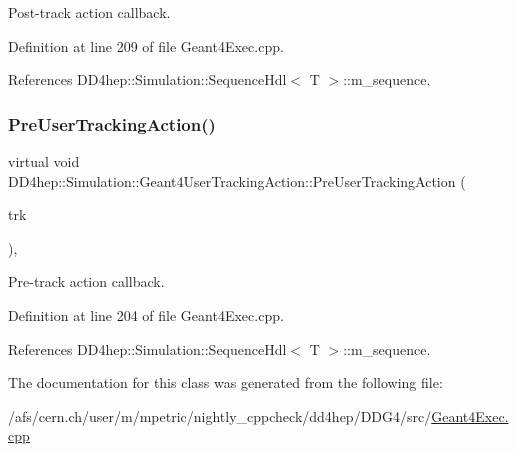 Post-\/track action callback. 



Definition at line 209 of file Geant4\+Exec.\+cpp.



References D\+D4hep\+::\+Simulation\+::\+Sequence\+Hdl$<$ T $>$\+::m\+\_\+sequence.

\hypertarget{class_d_d4hep_1_1_simulation_1_1_geant4_user_tracking_action_a3c44bbbed885071eb14c08274e1b32a2}{}\label{class_d_d4hep_1_1_simulation_1_1_geant4_user_tracking_action_a3c44bbbed885071eb14c08274e1b32a2} 
\subsubsection{\texorpdfstring{Pre\+User\+Tracking\+Action()}{PreUserTrackingAction()}}
{\footnotesize\ttfamily virtual void D\+D4hep\+::\+Simulation\+::\+Geant4\+User\+Tracking\+Action\+::\+Pre\+User\+Tracking\+Action (\begin{DoxyParamCaption}\item[{const G4\+Track $\ast$}]{trk }\end{DoxyParamCaption})\hspace{0.3cm}{\ttfamily [inline]}, {\ttfamily [virtual]}}



Pre-\/track action callback. 



Definition at line 204 of file Geant4\+Exec.\+cpp.



References D\+D4hep\+::\+Simulation\+::\+Sequence\+Hdl$<$ T $>$\+::m\+\_\+sequence.



The documentation for this class was generated from the following file\+:\begin{DoxyCompactItemize}
\item 
/afs/cern.\+ch/user/m/mpetric/nightly\+\_\+cppcheck/dd4hep/\+D\+D\+G4/src/\hyperlink{_geant4_exec_8cpp}{Geant4\+Exec.\+cpp}\end{DoxyCompactItemize}
